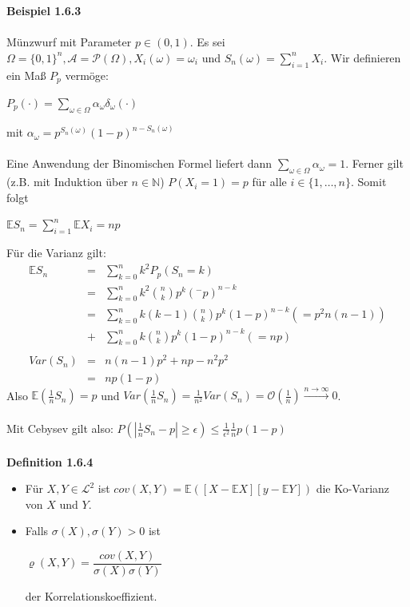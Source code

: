 \documentclass[10pt,a4paper]{report}
\numberwithin{equation}{section}
\numberwithin{figure}{section}
\theoremstyle{plain}
\theoremstyle{definition}
\theoremstyle{plain}
\theoremstyle{definition}
\theoremstyle{remark}
\theoremstyle{plain}
\theoremstyle{plain}
\theoremstyle{plain}
\newcommand{\1}{ \mathbb{1} } %
\begin{document}
\textbf{Beispiel 1.6.3}\\\\
Münzwurf mit Parameter $p \in (0,1)$. Es sei $\Omega=\{0,1\}^n, \mathcal{A}=\mathcal{P}(\Omega), X_i(\omega)=\omega_i$ und $S_n(\omega)=\sum\limits_{i=1}^n X_i$. Wir definieren ein Maß $P_p$ vermöge:
\begin{center}
$P_p(\cdot)=\sum\limits_{\omega \in \Omega}\alpha_\omega \delta_\omega(\cdot)$
\end{center} 
mit $\alpha_\omega=p^{S_n(\omega)}(1-p)^{n-S_n(\omega)}$\\\\
Eine Anwendung der Binomischen Formel liefert dann $\sum\limits_{\omega \in \Omega}\alpha_\omega=1$. Ferner gilt (z.B. mit Induktion über $n \in \mathbb{N}$) $P(X_i=1)=p$ für alle $i \in \{1,\dots,n\}$. Somit folgt
\begin{center}
$\mathbb{E}S_n=\sum\limits_{i=1}^n\mathbb{E}X_i=np$
\end{center}
Für die Varianz gilt:
\begin{eqnarray*}
\mathbb{E}S_n&=&\sum\limits_{k=0}^nk^2P_p(S_n=k)\\
&=& \sum\limits_{k=0}^nk^2\binom{n}{k}p^k(^-p)^{n-k}\\
&=&\sum\limits_{k=0}^nk(k-1)\binom{n}{k}p^k(1-p)^{n-k} (=p^2n(n-1))\\
&+& \sum\limits_{k=0}^n k\binom{n}{k}p^k(1-p)^{n-k} (=np)\\\\
Var(S_n)&=&n(n-1)p^2+np-n^2p^2\\
&=&np(1-p)
\end{eqnarray*}
Also $\mathbb{E}\left(\frac{1}{n}S_n\right)=p$ und $Var\left(\frac{1}{n}S_n\right)=\frac{1}{n^2}Var(S_n)=\mathcal{O}\left(\frac{1}{n}\right) \overset{n \to \infty}{\to} 0$.\\\\
Mit Cebysev gilt also: $P\left(\left|\frac{1}{n}S_n-p\right|\geq \epsilon\right)\leq \frac{1}{\epsilon^2}\frac{1}{n}p(1-p)$\\\\
\textbf{Definition 1.6.4}
\begin{itemize}
\item Für $X,Y \in \mathcal{L}^2$ ist $cov(X,Y)=\mathbb{E}([X-\mathbb{E}X][y-\mathbb{E}Y])$ die Ko-Varianz von $X$ und $Y$.
\item Falls $\sigma(X), \sigma(Y)>0$ ist
\begin{center}
$\varrho(X,Y)=\dfrac{cov(X,Y)}{\sigma(X)\sigma(Y)}$
\end{center}
der Korrelationskoeffizient.
\end{itemize}
\end{document}
